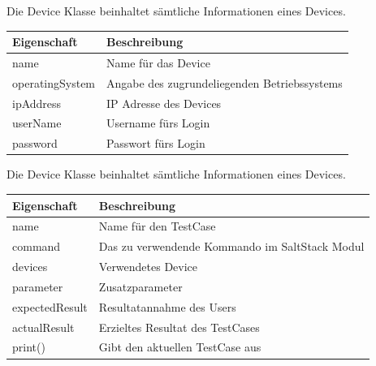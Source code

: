 \documentclass[a4,12pt]{scrartcl}
\begin{document}
Die Device Klasse beinhaltet sämtliche Informationen eines Devices.
\noindent \begin{table}[H]
\centering
    \begin{tabular}{@{}l p{12cm} @{}}\toprule    
    {Eigenschaft} & {Beschreibung}\\ \midrule      
    name & Name für das Device \\
    operatingSystem & Angabe des zugrundeliegenden Betriebssystems\\
    ipAddress & IP Adresse des Devices\\
    userName & Username fürs Login\\
    password & Passwort fürs Login\\
    \bottomrule
    \end{tabular}
\end{table}

Die Device Klasse beinhaltet sämtliche Informationen eines Devices.
\noindent \begin{table}[H]
\centering
    \begin{tabular}{@{}l p{12cm} @{}}\toprule    
    {Eigenschaft} & {Beschreibung}\\ \midrule      
    name & Name für den TestCase \\
    command & Das zu verwendende Kommando im SaltStack Modul\\
    devices & Verwendetes Device\\
    parameter & Zusatzparameter\\
    expectedResult & Resultatannahme des Users\\
    actualResult & Erzieltes Resultat des TestCases\\
    print() & Gibt den aktuellen TestCase aus\\
    \bottomrule
    \end{tabular}
\end{table}

\newpage
\end{document}
